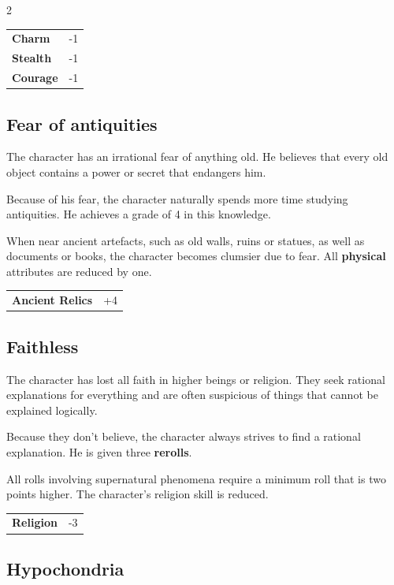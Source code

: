 \begin{multicols}{2}
    \begin{tabular}{@{}ll@{}}
        \textbf{Charm} & -1\\
        \textbf{Stealth} & -1\\
        \textbf{Courage} & -1\\
    \end{tabular}

    \subsection*{Fear of antiquities}

    The character has an irrational fear of anything old. He believes that every old object contains a power or secret that endangers him.

    Because of his fear, the character naturally spends more time studying antiquities. He achieves a grade of 4 in this knowledge.

    When near ancient artefacts, such as old walls, ruins or statues, as well as documents or books, the character becomes clumsier due to fear. All \textbf{physical} attributes are reduced by one.

    \begin{tabular}{@{}ll@{}}
        \textbf{Ancient Relics} & +4\\
    \end{tabular}

    \subsection*{Faithless}

    The character has lost all faith in higher beings or religion. They seek rational explanations for everything and are often suspicious of things that cannot be explained logically.

    Because they don't believe, the character always strives to find a rational explanation. He is given three \textbf{rerolls}.

    All rolls involving supernatural phenomena require a minimum roll that is two points higher. The character's religion skill is reduced.

    \begin{tabular}{@{}ll@{}}
        \textbf{Religion} & -3\\
    \end{tabular}

    \subsection*{Hypochondria}


\end{multicols}
